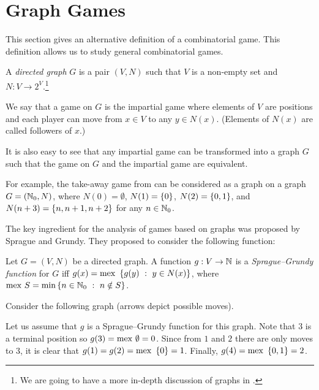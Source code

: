 \chapter{Graph Games}
This section gives an alternative definition of a combinatorial game.
This definition allows us to study general combinatorial games.
\begin{definition}
  A \emph{directed graph} $G$ is a pair $(V, N)$ such that $V$ is a non-empty
  set and $N : V \to 2^V$.\footnote{%
    We are going to have a more in-depth
    discussion of graphs in .
  }

  We say that a game on $G$ is the impartial game where elements of $V$ are
  positions and each player can move from $x \in V$ to any $y \in N(x)$.
  (Elements of $N(x)$ are called followers of $x$.)
\end{definition}

\begin{remark}
  It is also easy to see that any impartial game can be transformed into a graph
  $G$ such that the game on $G$ and the impartial game are equivalent.
\end{remark}

For example, the take-away game from 
can be considered as a graph on a graph $G = ({\mathbb{N}}_0, N)$,
where $N(0) = \emptyset$, $N(1) = \set{0}$, $N(2) = \set{0, 1}$, and
$N(n + 3) = \set{n, n + 1, n + 2}$ for any $n \in {\mathbb{N}}_0$.

The key ingredient for the analysis of games based on graphs was proposed
by Sprague and Grundy. They proposed to consider the following function:
\begin{definition}
  Let $G = (V, N)$ be a directed graph. A function $g : V \to {\mathbb{N}}$ is a
  \emph{Sprague--Grundy function} for $G$ iff
  $g(x) = \mex\set[y \in N(x)]{g(y)}$, where
  $\mex S = \min \set[n \notin S]{n \in \N_0}$.
\end{definition}


Consider the following graph (arrows depict possible moves).
\begin{center}
\end{center}
Let us assume that $g$ is a Sprague--Grundy function for this graph.
Note that $3$ is a terminal position so $g(3) = \mathrm{mex}~ \emptyset = 0$.
Since from $1$ and $2$ there are only moves to $3$, it is clear that
$g(1) = g(2) = \mex \set{0} = 1$. Finally, $g(4) = \mex \set{0, 1} = 2$.

